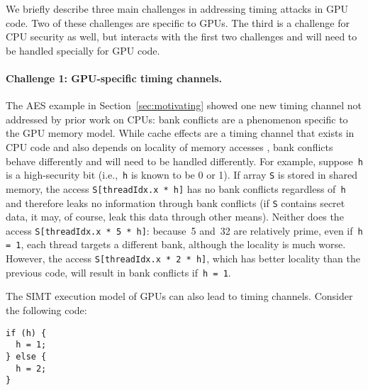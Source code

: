 
We briefly describe three main challenges in addressing timing attacks in GPU code.
%
Two of these challenges are specific to GPUs.
%
The third is a challenge for CPU security as well, but interacts with the
first two challenges and will need to be handled specially for GPU code.

\paragraph{Challenge 1: GPU-specific timing channels.}
The AES example in Section~\ref{sec:motivating} showed one new timing channel not addressed by prior work on CPUs: bank conflicts are a phenomenon specific to the GPU memory model.
%
While cache effects are a timing channel that exists in CPU code and also depends on locality of memory accesses , bank conflicts behave differently and will need to
be handled differently.
%
For example, suppose~\texttt{h} is a high-security bit (i.e.,~\texttt{h} is known to be 0 or 1).
%
If array \lstinline{S} is stored in shared memory,
the access \lstinline{S[threadIdx.x * h]} has no bank conflicts regardless
of~\texttt{h} and therefore leaks no information through bank conflicts
(if \lstinline{S} contains secret data, it may, of course, leak this data
through other means).
%
Neither does the access \lstinline{S[threadIdx.x * 5 * h]}: because~5
and~32 are relatively prime, even if~\texttt{h = 1}, each thread targets a
different bank, although the locality is much worse.
%
However, the access \lstinline{S[threadIdx.x * 2 * h]}, which has better
locality than the previous code, will result in bank conflicts if~\texttt{h = 1}.

The SIMT execution model of GPUs can also lead to timing channels.
%
Consider the following code:

\begin{lstlisting}
if (h) {
  h = 1;
} else {
  h = 2;
}
\end{lstlisting}

